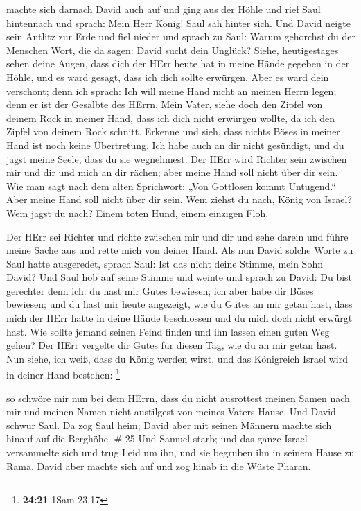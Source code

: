  machte sich darnach David auch auf und ging aus der Höhle
und rief Saul hintennach und sprach: Mein Herr König! Saul sah hinter
sich. Und David neigte sein Antlitz zur Erde und fiel nieder
 und sprach zu Saul: Warum gehorchst du der Menschen Wort,
die da sagen: David sucht dein Unglück?  Siehe,
heutigestages sehen deine Augen, dass dich der HErr heute hat in meine
Hände gegeben in der Höhle, und es ward gesagt, dass ich dich sollte
erwürgen. Aber es ward dein verschont; denn ich sprach: Ich will meine
Hand nicht an meinen Herrn legen; denn er ist der Gesalbte des HErrn.
 Mein Vater, siehe doch den Zipfel von deinem Rock in
meiner Hand, dass ich dich nicht erwürgen wollte, da ich den Zipfel von
deinem Rock schnitt. Erkenne und sieh, dass nichts Böses in meiner Hand
ist noch keine Übertretung. Ich habe auch an dir nicht gesündigt, und du
jagst meine Seele, dass du sie wegnehmest.  Der HErr wird
Richter sein zwischen mir und dir und mich an dir rächen; aber meine
Hand soll nicht über dir sein.  Wie man sagt nach dem alten
Sprichwort: „Von Gottlosen kommt Untugend.`` Aber meine Hand soll nicht
über dir sein.  Wem ziehst du nach, König von Israel? Wem
jagst du nach? Einem toten Hund, einem einzigen Floh.

 Der HErr sei Richter und richte zwischen mir und dir und
sehe darein und führe meine Sache aus und rette mich von deiner Hand.
 Als nun David solche Worte zu Saul hatte ausgeredet,
sprach Saul: Ist das nicht deine Stimme, mein Sohn David? Und Saul hob
auf seine Stimme und weinte  und sprach zu David: Du bist
gerechter denn ich: du hast mir Gutes bewiesen; ich aber habe dir Böses
bewiesen;  und du hast mir heute angezeigt, wie du Gutes an
mir getan hast, dass mich der HErr hatte in deine Hände beschlossen und
du mich doch nicht erwürgt hast.  Wie sollte jemand seinen
Feind finden und ihn lassen einen guten Weg gehen? Der HErr vergelte dir
Gutes für diesen Tag, wie du an mir getan hast.  Nun siehe,
ich weiß, dass du König werden wirst, und das Königreich Israel wird in
deiner Hand bestehen: \footnote{\textbf{24:21} 1Sam 23,17}

 so schwöre mir nun bei dem HErrn, dass du nicht ausrottest
meinen Samen nach mir und meinen Namen nicht austilgest von meines
Vaters Hause.  Und David schwur Saul. Da zog Saul heim;
David aber mit seinen Männern machte sich hinauf auf die Berghöhe. \# 25
 Und Samuel starb; und das ganze Israel versammelte sich und
trug Leid um ihn, und sie begruben ihn in seinem Hause zu Rama. David
aber machte sich auf und zog hinab in die Wüste Pharan.

